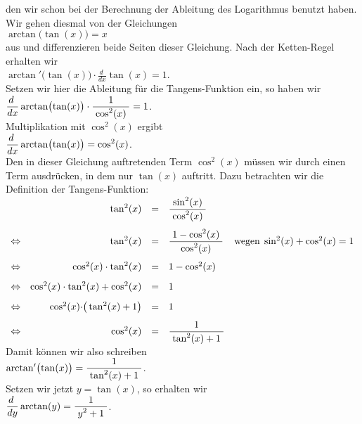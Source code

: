 \begin{enumerate}
      den wir schon bei der Berechnung der Ableitung des Logarithmus benutzt haben.
      Wir gehen diesmal von der Gleichungen 
      \\[0.2cm]
      \hspace*{1.3cm}
      $\arctan\bigl(\tan(x)\bigr) = x$
      \\[0.2cm]
      aus und differenzieren beide Seiten dieser Gleichung.  Nach der Ketten-Regel erhalten wir 
      \\[0.3cm]
      \hspace*{1.3cm}
      $\arctan'\bigl(\tan(x)\bigr) \cdot \frac{d\;}{dx} \tan(x) = 1$.
      \\[0.3cm]
      Setzen wir hier die Ableitung f\"ur die Tangens-Funktion ein, so haben wir
      \\[0.3cm]
      \hspace*{1.3cm}
      $\displaystyle \frac{d\;}{dx} \arctan\bigl(\tan(x)\bigr) \cdot \displaystyle\frac{\;\displaystyle1\;}{\;\displaystyle\cos^2(x)\;} = 1$.
      \\[0.3cm]
      Multiplikation mit $\cos^2(x)$ ergibt
      \\[0.3cm]
      \hspace*{1.3cm}
      $\displaystyle \frac{d\;}{dx} \arctan\bigl(\tan(x)\bigr) = \cos^2(x)$.
      \\[0.3cm]
      Den in dieser  Gleichung auftretenden Term $\cos^2(x)$ m\"ussen wir durch einen Term ausdr\"ucken, in dem
      nur $\tan(x)$ auftritt.  Dazu betrachten wir die Definition der Tangens-Funktion:      
      \\[0.3cm]
      \hspace*{1.3cm}
      $
      \begin{array}[t]{lrcll}
                & \tan^2(x) & = & \displaystyle\frac{\;\displaystyle\sin^2(x)\;}{\;\displaystyle\cos^2(x)\;} \\[0.5cm] 
\Leftrightarrow & \tan^2(x) & = & \displaystyle\frac{\;\displaystyle1 - \cos^2(x)\;}{\;\displaystyle\cos^2(x)\;} & \mbox{wegen}\; \sin^2(x) + \cos^2(x) = 1 \\[0.5cm] 
\Leftrightarrow & \cos^2(x) \cdot \tan^2(x) & = & 1 - \cos^2(x) &  \\[0.3cm] 
\Leftrightarrow & \cos^2(x) \cdot \tan^2(x) + \cos^2(x) & = & 1  &  \\[0.3cm] 
\Leftrightarrow & \cos^2(x) \cdot \bigr(\tan^2(x) + 1\bigr) & = & 1  &  \\[0.3cm] 
\Leftrightarrow & \cos^2(x)  & = &  \displaystyle\frac{\;\displaystyle1\;}{\;\displaystyle\tan^2(x) + 1\;} &  
      \end{array}
      $
      \\[0.3cm]
      Damit k\"onnen wir also schreiben 
      \\[0.3cm]
      \hspace*{1.3cm}
      $\arctan'\bigl(\tan(x)\bigr) = \displaystyle\frac{\;\displaystyle1\;}{\;\displaystyle\tan^2(x) + 1\;}$.
      \\[0.3cm]
      Setzen wir jetzt $y = \tan(x)$, so erhalten wir 
      \\[0.3cm]
      \hspace*{1.3cm}
      $\displaystyle\frac{d\;}{dy} \arctan(y) = \displaystyle\frac{\;\displaystyle1\;}{\;\displaystyle y^2 + 1\;}$.
\end{enumerate}


